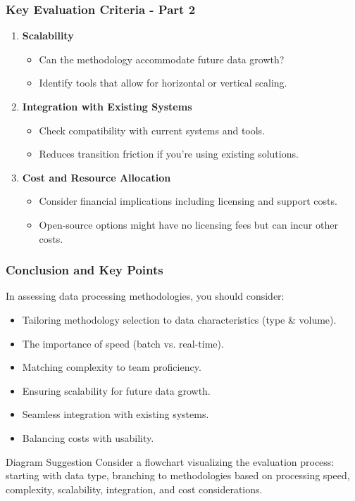 \documentclass[aspectratio=169]{beamer}
\begin{document}
\begin{frame}[fragile]
    \frametitle{Key Evaluation Criteria - Part 2}
    \begin{enumerate}[resume]
        \item \textbf{Scalability}
        \begin{itemize}
            \item Can the methodology accommodate future data growth?
            \item Identify tools that allow for horizontal or vertical scaling.
        \end{itemize}

        \item \textbf{Integration with Existing Systems}
        \begin{itemize}
            \item Check compatibility with current systems and tools.
            \item Reduces transition friction if you're using existing solutions.
        \end{itemize}

        \item \textbf{Cost and Resource Allocation}
        \begin{itemize}
            \item Consider financial implications including licensing and support costs.
            \item Open-source options might have no licensing fees but can incur other costs.
        \end{itemize}
    \end{enumerate}
\end{frame}

\begin{frame}[fragile]
    \frametitle{Conclusion and Key Points}
    In assessing data processing methodologies, you should consider:
    \begin{itemize}
        \item Tailoring methodology selection to data characteristics (type \& volume).
        \item The importance of speed (batch vs. real-time).
        \item Matching complexity to team proficiency.
        \item Ensuring scalability for future data growth.
        \item Seamless integration with existing systems.
        \item Balancing costs with usability.
    \end{itemize}

    \begin{block}{Diagram Suggestion}
        Consider a flowchart visualizing the evaluation process: starting with data type, branching to methodologies based on processing speed, complexity, scalability, integration, and cost considerations.
    \end{block}
\end{frame}
\end{document}
